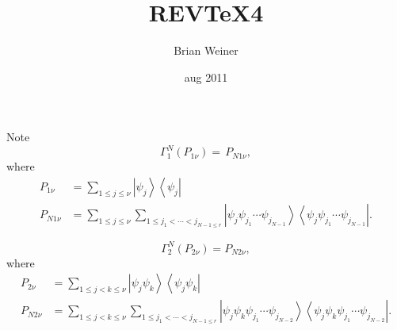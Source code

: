 \documentclass[aps,preprint]{revtex4}%
\begin{document}
\preprint{ }
\title[ ]{REV\TeX4}
\author{Brian Weiner}
\affiliation{}

\begin{abstract}


\end{abstract}
\volumeyear{ }
\date{aug 2011}
\received{}

\maketitle
\tableofcontents


Note
\begin{equation}
\Gamma_{1}^{N}\left(  P_{1\nu}\right)  =\,P_{N1\nu},
\end{equation}
where
\begin{align}
P_{1\nu}  & =\sum_{1\leq j\leq\nu}\left\vert \psi_{j}\right\rangle
\left\langle \psi_{j}\right\vert \\
P_{N1\nu}  & =\sum_{1\leq j\leq\nu}\sum_{1\leq j_{1}<\cdots<j_{N-1\leq r}%
}\left\vert \psi_{j}\psi_{j_{1}}\cdots\psi_{j_{N-1}}\right\rangle \left\langle
\psi_{j}\psi_{j_{1}}\cdots\psi_{j_{N-1}}\right\vert .
\end{align}


\bigskip%

\begin{equation}
\Gamma_{2}^{N}\left(  P_{2\nu}\right)  =P_{N2\nu},
\end{equation}
where
\begin{align}
P_{2\nu}  & =\sum_{1\leq j<k\leq\nu}\left\vert \psi_{j}\psi_{k}\right\rangle
\left\langle \psi_{j}\psi_{k}\right\vert \\
P_{N2\nu}  & =\sum_{1\leq j<k\leq\nu}\sum_{1\leq j_{1}<\cdots<j_{N-1\leq r}%
}\left\vert \psi_{j}\psi_{k}\psi_{j_{1}}\cdots\psi_{j_{N-2}}\right\rangle
\left\langle \psi_{j}\psi_{k}\psi_{j_{1}}\cdots\psi_{j_{N-2}}\right\vert .
\end{align}


\bigskip
\end{document}
